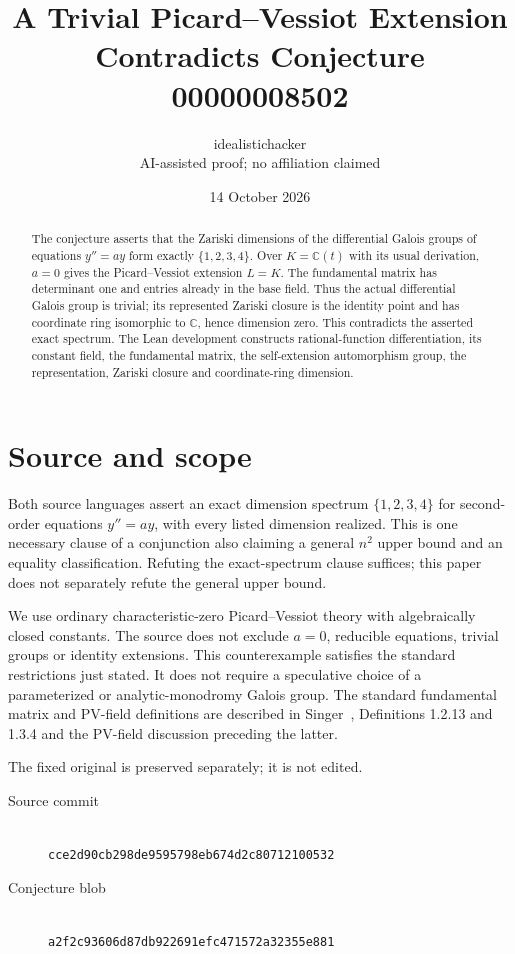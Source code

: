 \documentclass[10pt,a4paper]{article}
\title{A Trivial Picard--Vessiot Extension\protect\\Contradicts Conjecture 00000008502}
\author{idealistichacker\protect\\\small AI-assisted proof; no affiliation claimed}
\date{14 October 2026}
\begin{document}
\maketitle
\begin{abstract}
The conjecture asserts that the Zariski dimensions of the differential Galois
groups of equations $y''=ay$ form exactly $\{1,2,3,4\}$. Over
$K=\mathbb C(t)$ with its usual derivation, $a=0$ gives the Picard--Vessiot
extension $L=K$. The fundamental matrix has determinant one and entries already
in the base field. Thus the actual differential Galois group is trivial;
its represented Zariski closure is the identity point and has coordinate ring
isomorphic to $\mathbb C$, hence dimension zero. This contradicts the asserted
exact spectrum. The Lean development constructs rational-function differentiation,
its constant field, the fundamental matrix, the self-extension automorphism group,
the representation, Zariski closure and coordinate-ring dimension.
\end{abstract}

\section{Source and scope}
Both source languages assert an exact dimension spectrum $\{1,2,3,4\}$ for
second-order equations $y''=ay$, with every listed dimension realized. This is
one necessary clause of a conjunction also claiming a general $n^2$ upper
bound and an equality classification. Refuting the exact-spectrum clause
suffices; this paper does not separately refute the general upper bound.

We use ordinary characteristic-zero Picard--Vessiot theory with algebraically
closed constants. The source does not exclude $a=0$, reducible equations,
trivial groups or identity extensions. This counterexample satisfies the
standard restrictions just stated. It does not require a speculative choice
of a parameterized or analytic-monodromy Galois group. The standard fundamental
matrix and PV-field definitions are described in Singer~\cite{Singer},
Definitions 1.2.13 and 1.3.4 and the PV-field discussion preceding the latter.

The fixed original is preserved separately; it is not edited.
\begin{description}
\item[Source commit] \hfill\\
\texttt{cce2d90cb298de9595798eb674d2c80712100532}
\item[Conjecture blob] \hfill\\
\texttt{a2f2c93606d87db922691efc471572a32355e881}
\end{description}
\end{document}
